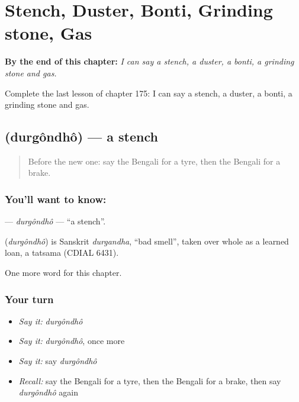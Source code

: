 
\chapter{Stench, Duster, Bonti, Grinding stone, Gas}
\label{ch:bn-stench-duster-bonti-grinding-stone-gas}

\begin{chapteropening}
\textbf{By the end of this chapter:} \emph{I can say a stench, a duster, a bonti, a grinding stone and gas.}

Complete the last lesson of chapter 175: I can say a stench, a duster, a bonti, a grinding stone and gas.
\end{chapteropening}

\section[\texorpdfstring{\bn{দুর্গন্ধ} (durgôndhô)}{দুর্গন্ধ (durgôndhô)}]{ (durgôndhô) — a stench}

\label{lesson:BN-C175-durgondho}



\begin{quote}
Before the new one: say the Bengali for a tyre, then the Bengali for a brake.
\end{quote}

\subsection*{You'll want to know: }
\textbf{} — \emph{durgôndhô} — \textquotedblleft{}a stench\textquotedblright{}.

\begin{cousinweb}
\textbf{} (\emph{durgôndhô}) is Sanskrit \emph{durgandha}, \textquotedblleft{}bad smell\textquotedblright{}, taken over whole as a learned loan, a tatsama (CDIAL 6431).
\end{cousinweb}

\begin{grammarlens}[title={What you've built}]
One more word for this chapter.
\end{grammarlens}

\subsection*{Your turn}
\begin{itemize}
\raggedright
  \item \emph{Say it:} \emph{durgôndhô}
  \item \emph{Say it:} \emph{durgôndhô}, once more
  \item \emph{Say it:} say \emph{durgôndhô}
  \item \emph{Recall:} say the Bengali for a tyre, then the Bengali for a brake, then say \emph{durgôndhô} again
\end{itemize}

